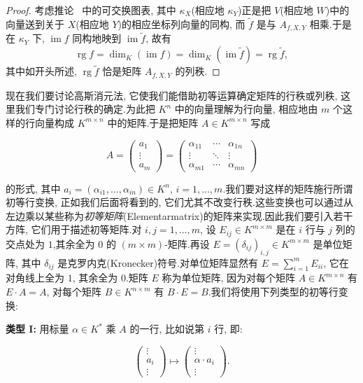 \begin{proof}
考虑推论~ 中的可交换图表, 其中 $\kappa_X$(相应地 $\kappa_Y$)正是把 $V$(相应地 $W$)中的向量送到关于 $X$(相应地 $Y$)的相应坐标列向量的同构, 而 $\tilde{f}$ 是与 $A_{f, X, Y}$ 相乘.于是在 $\kappa_Y$ 下, $\operatorname{im} f$ 同构地映到 $\operatorname{im} \tilde{f}$, 故有
\[
\operatorname{rg} f = \dim_K(\operatorname{im} f) = \dim_K(\operatorname{im} \tilde{f}) = \operatorname{rg} \tilde{f},
\]
其中如开头所述, $\operatorname{rg} \tilde{f}$ 恰是矩阵 $A_{f, X, Y}$ 的列秩.
\end{proof}

现在我们要讨论高斯消元法, 它使我们能借助初等运算确定矩阵的行秩或列秩, 这里我们专门讨论行秩的确定.为此把 $K^n$ 中的向量理解为行向量, 相应地由 $m$ 个这样的行向量构成 $K^{m \times n}$ 中的矩阵.于是把矩阵 $A \in K^{m \times n}$ 写成

\[
A = \begin{pmatrix} a_1 \\ \vdots \\ a_m \end{pmatrix} =
\begin{pmatrix}
\alpha_{11} & \cdots & \alpha_{1n} \\
\vdots & \ddots & \vdots \\
\alpha_{m1} & \cdots & \alpha_{mn}
\end{pmatrix}
\]

的形式, 其中 $a_i = (\alpha_{i1}, \ldots, \alpha_{in}) \in K^n$, $i = 1, \ldots, m$.我们要对这样的矩阵施行所谓初等行变换, 正如我们后面将看到的, 它们尤其不改变行秩.这些变换也可以通过从左边乘以某些称为\emph{初等矩阵}(\textup{Elementarmatrix})的矩阵来实现.因此我们要引入若干方阵, 它们用于描述初等矩阵.对 $i, j = 1, \ldots, m$, 设 $E_{ij} \in K^{m \times m}$ 是在 $i$ 行与 $j$ 列的交点处为 $1$,其余全为 $0$ 的 $(m \times m)$-矩阵.再设 $E = (\delta_{ij})_{i, j} \in K^{m \times m}$ 是单位矩阵, 其中 $\delta_{ij}$ 是克罗内克(Kronecker)符号.对单位矩阵显然有 $E = \sum_{i = 1}^{m}E_{ii}$, 它在对角线上全为 $1$, 其余全为 $0$.矩阵 $E$ 称为单位矩阵, 因为对每个矩阵 $A \in K^{m \times n}$ 有 $E \cdot A = A$, 对每个矩阵 $B \in K^{n \times m}$ 有 $B \cdot E = B$.我们将使用下列类型的初等行变换:

\textbf{类型 I:} 用标量 $\alpha \in K^*$ 乘 $A$ 的一行, 比如说第 $i$ 行, 即:

\[
\begin{pmatrix} \vdots \\ a_i \\ \vdots \end{pmatrix}
\longmapsto
\begin{pmatrix} \vdots \\ \alpha \cdot a_i \\ \vdots \end{pmatrix}\text{.}
\]


